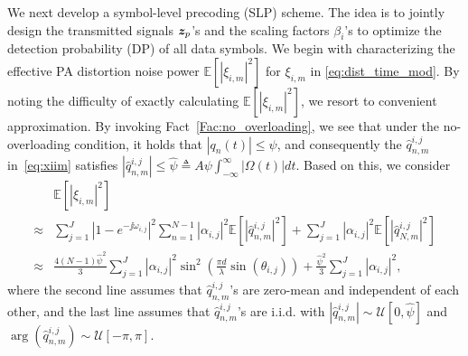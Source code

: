 \documentclass[10pt,twocolumn,twoside]{IEEEtran}
\begin{document}
We next develop a symbol-level precoding (SLP) scheme.
The idea is to jointly design the transmitted signals ${\bm z}_p$'s and the scaling factors $\beta_i$'s to optimize the detection probability (DP) of all data symbols.
We begin with characterizing the effective PA distortion noise power
$\mathbb{E}[|\xi_{i,m}|^2]$ for $\xi_{i,m}$ in \eqref{eq:dist_time_mod}.
By noting the difficulty of exactly calculating $\mathbb{E}[|\xi_{i,m}|^2]$, we resort to convenient approximation.
By invoking Fact~\ref{Fac:no_overloading}, we see that under the no-overloading condition,
it holds that $|q_n(t)| \le \psi$, and consequently the $\hat q_{n,m}^{i,j}$ in~\eqref{eq:xiim} satisfies
$
|\hat q_{n,m}^{i,j}| \le \hat \psi \triangleq A\psi  \int_{-\infty}^\infty |\Omega(t)|dt.
$
Based on this, we consider
\begin{equation*}
\begin{aligned}
&\mathbb{E}[|\xi_{i,m}|^2] \\
 \approx & \sum_{j=1}^J   |1-e^{-\jj \omega_{i,j}}|^2  \sum_{n=1}^{N-1} |\alpha_{i,j}|^2 \mathbb E[|\hat q_{n,m}^{i,j}|^2]   +  \sum_{j=1}^J |\alpha_{i,j}|^2\mathbb E[|\hat q_{N,m}^{i,j}|^2]\\
 \approx & \frac{4(N-1) \hat \psi^2}{3}   \sum_{j=1}^J |\alpha_{i,j}|^2  \sin^2 \left( \frac{\pi d}{\lambda} \sin(\theta_{i,j})\right) +  \frac{\hat \psi^2}{3} \sum_{j=1}^J \left| \alpha_{i,j}\right|^2,
\end{aligned}
\end{equation*}
where the  second line assumes that $\hat q_{n,m}^{i,j}$'s are zero-mean and independent of each other, and the last line assumes that $\hat q_{n,m}^{i,j}$'s are i.i.d. with $|\hat q_{n,m}^{i,j}| \sim \mathcal{U}{[0,\hat \psi]}$ and $\arg(\hat q_{n,m}^{i,j}) \sim \mathcal{U}{[-\pi,\pi]}$.
\end{document}
